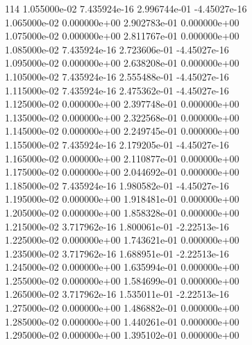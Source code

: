 114	1.055000e-02	7.435924e-16	2.996744e-01	-4.45027e-16	\\ 	1.065000e-02	0.000000e+00	2.902783e-01	0.000000e+00	\\ 	1.075000e-02	0.000000e+00	2.811767e-01	0.000000e+00	\\ 	1.085000e-02	7.435924e-16	2.723606e-01	-4.45027e-16	\\ 	1.095000e-02	0.000000e+00	2.638208e-01	0.000000e+00	\\ 	1.105000e-02	7.435924e-16	2.555488e-01	-4.45027e-16	\\ 	1.115000e-02	7.435924e-16	2.475362e-01	-4.45027e-16	\\ 	1.125000e-02	0.000000e+00	2.397748e-01	0.000000e+00	\\ 	1.135000e-02	0.000000e+00	2.322568e-01	0.000000e+00	\\ 	1.145000e-02	0.000000e+00	2.249745e-01	0.000000e+00	\\ 	1.155000e-02	7.435924e-16	2.179205e-01	-4.45027e-16	\\ 	1.165000e-02	0.000000e+00	2.110877e-01	0.000000e+00	\\ 	1.175000e-02	0.000000e+00	2.044692e-01	0.000000e+00	\\ 	1.185000e-02	7.435924e-16	1.980582e-01	-4.45027e-16	\\ 	1.195000e-02	0.000000e+00	1.918481e-01	0.000000e+00	\\ 	1.205000e-02	0.000000e+00	1.858328e-01	0.000000e+00	\\ 	1.215000e-02	3.717962e-16	1.800061e-01	-2.22513e-16	\\ 	1.225000e-02	0.000000e+00	1.743621e-01	0.000000e+00	\\ 	1.235000e-02	3.717962e-16	1.688951e-01	-2.22513e-16	\\ 	1.245000e-02	0.000000e+00	1.635994e-01	0.000000e+00	\\ 	1.255000e-02	0.000000e+00	1.584699e-01	0.000000e+00	\\ 	1.265000e-02	3.717962e-16	1.535011e-01	-2.22513e-16	\\ 	1.275000e-02	0.000000e+00	1.486882e-01	0.000000e+00	\\ 	1.285000e-02	0.000000e+00	1.440261e-01	0.000000e+00	\\ 	1.295000e-02	0.000000e+00	1.395102e-01	0.000000e+00	\\ \hline
